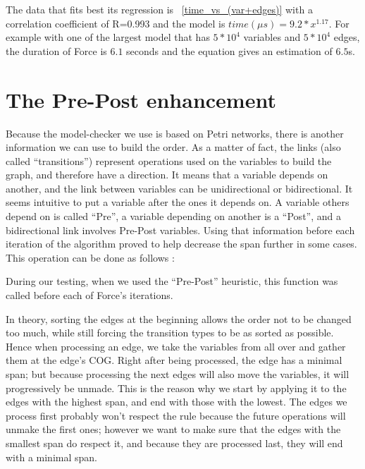 \documentclass[12pt]{report}
\begin{document}
The data that fits best its regression is ~\ref{time_vs_(var+edges)} with a correlation coefficient of R=0.993 and the model is $time({\mu}s)= {9.2}*x^{1.17}$. For example with one of the largest model that has $5*10^4$ variables and $5*10^4$ edges, the duration of Force is $6.1$ seconds and the equation gives an estimation of $6.5$s.

\section{The Pre-Post enhancement} \label{sec:pre_post}

Because the model-checker we use is based on Petri networks, there is another information we can use to build the order. As a matter of fact, the links (also called \enquote{transitions}) represent operations used on the variables to build the graph, and therefore have a direction. It means that a variable depends on another, and the link between variables can be unidirectional or bidirectional. It seems intuitive to put a variable after the ones it depends on. A variable others depend on is called \enquote{Pre}, a variable depending on another is a \enquote{Post}, and a bidirectional link involves Pre-Post variables. Using that information before each iteration of the algorithm proved to help decrease the span further in some cases.
This operation can be done as follows :

\begin{algorithm}
\begin{algorithmic}[1]
  \EndFor
\EndFunction
\label{order-pre-post}
\end{algorithmic}
\end{algorithm}

During our testing, when we used the \enquote{Pre-Post} heuristic, this function was called before each of Force's iterations.

In theory, sorting the edges at the beginning allows the order not to be changed too much, while still forcing the transition types to be as sorted as possible. Hence when processing an edge, we take the variables from all over and gather them at the edge's COG. Right after being processed, the edge has a minimal span; but because processing the next edges will also move the variables, it will progressively be unmade. This is the reason why we start by applying it to the edges with the highest span, and end with those with the lowest. The edges we process first probably won't respect the rule because the future operations will unmake the first ones; however we want to make sure that the edges with the smallest span do respect it, and because they are processed last, they will end with a minimal span.
\end{document}
